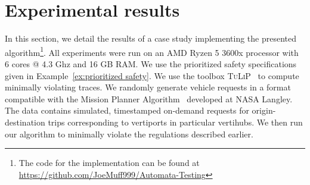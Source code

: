 \section{Experimental results}\label{sec:UAM-NFM-experiments}
In this section, we detail the results of a case study implementing the presented algorithm\footnote{The code for the implementation can be found at \url{https://github.com/JoeMuff999/Automata-Testing}}. All experiments were run on an AMD Ryzen 5 3600x processor with 6 cores @ 4.3 Ghz and 16 GB RAM. We use the prioritized safety specifications given in Example~\ref{ex:prioritized safety}. We use the toolbox \textsc{TuLiP}~\cite{wongpiromsarn2011tulip} to compute minimally violating traces. 
We randomly generate vehicle requests in a format compatible with the Mission Planner Algorithm~\cite{guerreiro2019mission} developed at NASA Langley. The data contains simulated, timestamped on-demand requests for origin-destination trips corresponding to vertiports in particular vertihubs. We then run our algorithm to minimally violate the regulations described earlier.

